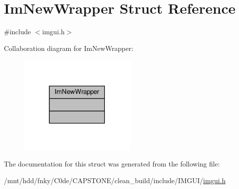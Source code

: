 \hypertarget{structImNewWrapper}{}\section{Im\+New\+Wrapper Struct Reference}
\label{structImNewWrapper}


{\ttfamily \#include $<$imgui.\+h$>$}



Collaboration diagram for Im\+New\+Wrapper\+:
\nopagebreak
\begin{figure}[H]
\begin{center}
\leavevmode
\includegraphics[width=165pt]{structImNewWrapper__coll__graph}
\end{center}
\end{figure}


The documentation for this struct was generated from the following file\+:\begin{DoxyCompactItemize}
\item 
/mnt/hdd/fnky/\+C0de/\+C\+A\+P\+S\+T\+O\+N\+E/clean\+\_\+build/include/\+I\+M\+G\+U\+I/\hyperlink{imgui_8h}{imgui.\+h}\end{DoxyCompactItemize}
